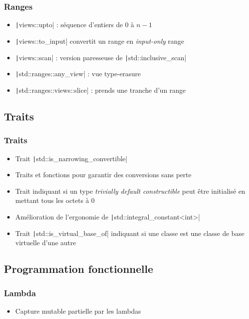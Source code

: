 \documentclass[C++.tex]{subfiles}
\begin{document}
\begin{frame}[fragile]
	\frametitle{Ranges}
	\begin{itemize}
		\item \texttt|views::upto| : séquence d'entiers de 0 à $n - 1$
		\item \texttt|views::to_input| convertit un range en \textit{input-only} range
		\item \texttt|views::scan| : version paresseuse de \texttt|std::inclusive_scan|
		\item \texttt|std::ranges::any_view| : vue \og{}type-erasure\fg{}
		\item \texttt|std::ranges::views::slice| : prends une tranche d'un range
	\end{itemize}

\end{frame}

\subsection*{Traits}
\begin{frame}[fragile]
	\frametitle{Traits}
	\begin{itemize}
		\item Trait \texttt|std::is_narrowing_convertible|
		\item Traits et fonctions pour garantir des conversions sans perte
		\item Trait indiquant si un type \textit{trivially default constructible} peut être initialisé en mettant tous les octets à 0
		\item Amélioration de l'ergonomie de \texttt|std::integral_constant<int>|
		\item Trait \texttt|std::is_virtual_base_of| indiquant si une classe est une classe de base virtuelle d'une autre
	\end{itemize}

\end{frame}

\subsection*{Programmation fonctionnelle}
\begin{frame}[fragile]
	\frametitle{Lambda}
	\begin{itemize}
		\item Capture mutable partielle par les lambdas
	\end{itemize}
\end{frame}
\end{document}
